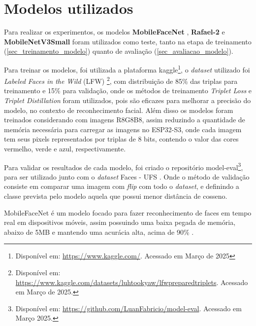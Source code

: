 \section{Modelos utilizados}\label{sec_modelo_utilizado}
Para realizar os experimentos, os modelos \textbf{MobileFaceNet} \cite{leondgarse}, \textbf{Rafael-2} e
\textbf{MobileNetV3Small} \cite{howard2019searchingmobilenetv3}
foram utilizados como teste, tanto na etapa de treinamento (\autoref{sec_treinamento_modelo}) quanto de avaliação
(\autoref{sec_avaliacao_modelo}).

Para treinar os modelos, foi utilizada a plataforma kaggle\footnote{
Disponível em: \url{https://www.kaggle.com/}. Acessado em Março de 2025}, o \textit{dataset} utilizado foi
\textit{Labeled Faces in the Wild} (LFW) \footnote{
Disponível em: \url{https://www.kaggle.com/datasets/luhtookyaw/lfwpreparedtriplets}. Acessado em Março de 2025.},
com distribuição de 85\% das triplas para treinamento e 15\% para validação,
onde os métodos de treinamento \textit{Triplet Loss} e \textit{Triplet Distillation}
\cite{triplet_distillation_face_recognition} foram utilizados, pois são eficazes para melhorar a precisão do modelo,
no contexto de reconhecimento facial.
Além disso os modelos foram treinados considerando com imagens R8G8B8, assim reduzindo a quantidade de memória necessária
para carregar as imagens no ESP32-S3, onde cada imagem tem seus pixels representados por triplas de 8 bits, contendo o
valor das cores vermelho, verde e azul, respectivamente.

Para validar os resultados de cada modelo, foi criado o repositório model-eval\footnote{
Disponível em: \url{https://github.com/LuanFabricio/model-eval}. Acessado em Março 2025.}, para ser utilizado junto com o
\textit{dataset} Faces - UFS \cite{leandro}.
Onde o método de validação consiste em comparar uma imagem com \textit{flip} com todo o \textit{dataset}, e definindo
a classe prevista pelo modelo aquela que possui menor distância de cosseno.

MobileFaceNet é um modelo focado para fazer reconhecimento de faces em tempo real em dispositivos móveis,
assim possuindo uma baixa pegada de memória, abaixo de 5MB e mantendo uma acurácia alta, acima de 90\% \cite{leandro}.

